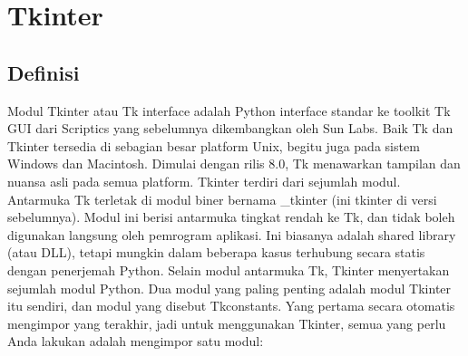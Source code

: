 \section {Tkinter}

\subsection{Definisi}
Modul Tkinter atau Tk interface adalah Python interface standar ke toolkit Tk GUI dari Scriptics yang sebelumnya dikembangkan oleh Sun Labs. Baik Tk dan Tkinter tersedia di sebagian besar platform Unix, begitu juga pada sistem Windows dan Macintosh. Dimulai dengan rilis 8.0, Tk menawarkan tampilan dan nuansa asli pada semua platform. Tkinter terdiri dari sejumlah modul. Antarmuka Tk terletak di modul biner bernama _tkinter (ini tkinter di versi sebelumnya). Modul ini berisi antarmuka tingkat rendah ke Tk, dan tidak boleh digunakan langsung oleh pemrogram aplikasi. Ini biasanya adalah shared library (atau DLL), tetapi mungkin dalam beberapa kasus terhubung secara statis dengan penerjemah Python. Selain modul antarmuka Tk, Tkinter menyertakan sejumlah modul Python. Dua modul yang paling penting adalah modul Tkinter itu sendiri, dan modul yang disebut Tkconstants. Yang pertama secara otomatis mengimpor yang terakhir, jadi untuk menggunakan Tkinter, semua yang perlu Anda lakukan adalah mengimpor satu modul: 


